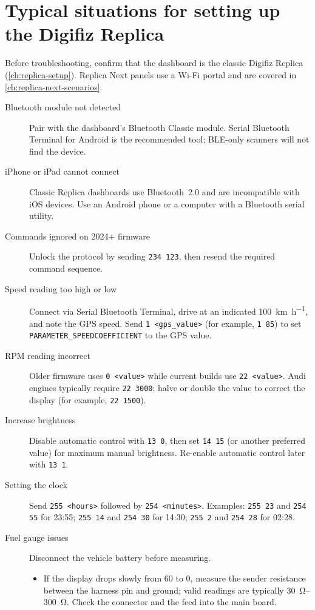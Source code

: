 \chapter{Typical situations for setting up the Digifiz Replica}\label{ch:replica-scenarios}

Before troubleshooting, confirm that the dashboard is the classic Digifiz Replica (\autoref{ch:replica-setup}). Replica Next panels use a Wi-Fi portal and are covered in \autoref{ch:replica-next-scenarios}.

\begin{description}
    \item[Bluetooth module not detected] Pair with the dashboard's Bluetooth Classic module. Serial Bluetooth Terminal for Android is the recommended tool; BLE-only scanners will not find the device.
    \item[iPhone or iPad cannot connect] Classic Replica dashboards use Bluetooth~2.0 and are incompatible with iOS devices. Use an Android phone or a computer with a Bluetooth serial utility.
    \item[Commands ignored on 2024+ firmware] Unlock the protocol by sending \verb|234 123|, then resend the required command sequence.
    \item[Speed reading too high or low] Connect via Serial Bluetooth Terminal, drive at an indicated \SI{100}{\kilo\metre\per\hour}, and note the GPS speed. Send \verb|1 <gps_value>| (for example, \verb|1 85|) to set \texttt{PARAMETER\_SPEEDCOEFFICIENT} to the GPS value.
    \item[RPM reading incorrect] Older firmware uses \verb|0 <value>| while current builds use \verb|22 <value>|. Audi engines typically require \verb|22 3000|; halve or double the value to correct the display (for example, \verb|22 1500|).
    \item[Increase brightness] Disable automatic control with \verb|13 0|, then set \verb|14 15| (or another preferred value) for maximum manual brightness. Re-enable automatic control later with \verb|13 1|.
    \item[Setting the clock] Send \verb|255 <hours>| followed by \verb|254 <minutes>|. Examples: \verb|255 23| and \verb|254 55| for 23:55; \verb|255 14| and \verb|254 30| for 14:30; \verb|255 2| and \verb|254 28| for 02:28.
    \item[Fuel gauge issues] Disconnect the vehicle battery before measuring.\begin{itemize}
        \item If the display drops slowly from 60 to 0, measure the sender resistance between the harness pin and ground; valid readings are typically \SIrange{30}{300}{\ohm}. Check the connector and the feed into the main board.

\end{itemize}
\end{description}
